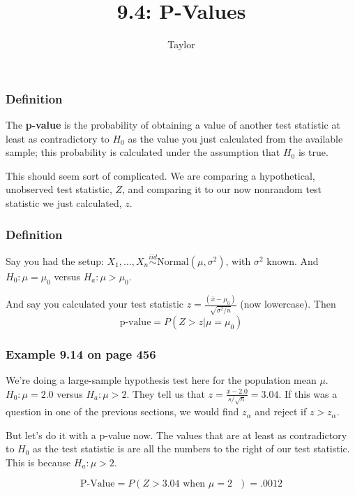 \documentclass{beamer}
\title["9.4"]{9.4: P-Values}
\author{Taylor}
\institute[UVA] 
{
University of Virginia \\
\medskip
\textit{} 
}
\date{}
\begin{document}

\begin{frame}
\titlepage 
\end{frame}

\begin{frame}
\frametitle{Definition}

The \textbf{p-value} is the probability of obtaining a value of another test statistic at least as contradictory to $H_0$ as the value you just calculated from the available sample; this probability is calculated under the assumption that $H_0$ is true.
\newline

This should seem sort of complicated. We are comparing a hypothetical, unobserved test statistic, $Z$, and comparing it to our now nonrandom test statistic we just calculated, $z$.


\end{frame}
\begin{frame}
\frametitle{Definition}

Say you had the setup: $X_1, \ldots, X_n \overset{iid}{\sim} \text{Normal}(\mu, \sigma^2)$, with $\sigma^2$ known. And $H_0: \mu = \mu_0$ versus $H_a: \mu > \mu_0$.
\newline

And say you calculated your test statistic $z = \frac{(\bar{x} - \mu_0)}{\sqrt{\sigma^2/n}}$ (now lowercase). Then
\[
\text{p-value} = P(Z>z|\mu=\mu_0)
\]


\end{frame}



\begin{frame}
\frametitle{Example 9.14 on page 456}

We're doing a large-sample hypothesis test here for the population mean $\mu$. $H_0: \mu = 2.0$ versus $H_a: \mu > 2$. They tell us that $z = \frac{\bar{x} - 2.0}{s/\sqrt{n}} = 3.04$. If this was a question in one of the previous sections, we would find $z_{\alpha}$ and reject if $z > z_{\alpha}$. 
\newline

But let's do it with a p-value now. The values that are at least as contradictory to $H_0$ as the test statistic is are all the numbers to the right of our test statistic. This is because $H_a: \mu > 2$.
\newline

\[
\text{P-Value} = P(Z > 3.04 \text{ when $\mu = 2$ }) = .0012
\]

\end{frame}
\end{document}
